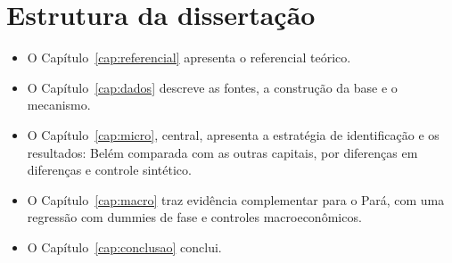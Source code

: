 \section{Estrutura da dissertação}

\begin{itemize}
  \item O Capítulo~\ref{cap:referencial} apresenta o referencial teórico.
  \item O Capítulo~\ref{cap:dados} descreve as fontes, a construção da base e o mecanismo.
  \item O Capítulo~\ref{cap:micro}, central, apresenta a estratégia de identificação e os resultados:
        Belém comparada com as outras capitais, por diferenças em diferenças e controle sintético.
  \item O Capítulo~\ref{cap:macro} traz evidência complementar para o Pará, com uma regressão com
        dummies de fase e controles macroeconômicos.
  \item O Capítulo~\ref{cap:conclusao} conclui.
\end{itemize}

